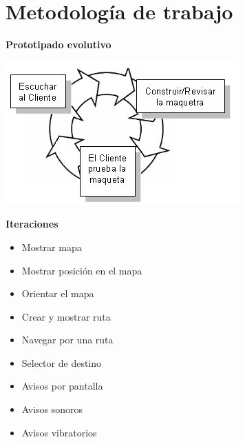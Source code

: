 \section{Metodología de trabajo}

\begin{slide}
  \begin{block}{\textbf{Prototipado evolutivo}}
    \begin{center}
      \includegraphics[height=0.5\textheight]{img/prototipo.png}
    \end{center}
  \end{block}
\end{slide}

\begin{slide}
  \begin{block}{\textbf{Iteraciones}}
    \begin{itemize}
      \item Mostrar mapa
      \item Mostrar posición en el mapa
      \item Orientar el mapa
      \item Crear y mostrar ruta
      \item Navegar por una ruta
      \item Selector de destino
      \item Avisos por pantalla
      \item Avisos sonoros
      \item Avisos vibratorios
    \end{itemize}
  \end{block}
\end{slide}

